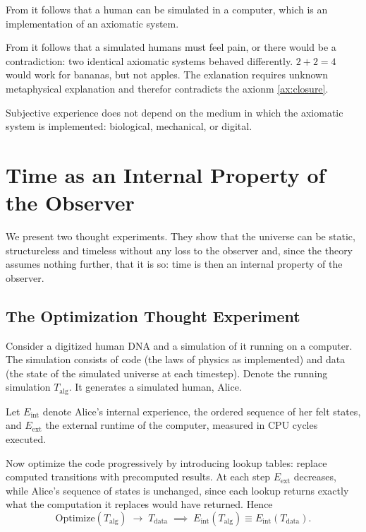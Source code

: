 \documentclass[11pt]{book}
\begin{document}
From  it follows that a human can be simulated in a
computer, which is an implementation of an axiomatic system.

From  it follows that a simulated humans must feel pain, or there
would be a contradiction: two identical axiomatic systems behaved differently.
$2+2=4$ would work for bananas, but not apples. The exlanation requires
unknown metaphysical explanation and therefor contradicts the axionm \ref{ax:closure}.

\begin{deduction}\label{ded:substrate}
  Subjective experience does not depend on the medium in which the
  axiomatic system is implemented: biological, mechanical, or digital.
\end{deduction}


\chapter{Time as an Internal Property of the Observer}
\label{ch:time}

We present two thought experiments. They show that the universe can be
static, structureless and timeless without any loss to the observer and,
since the theory assumes nothing further, that it is so: time is then an
internal property of the observer.


\section{The Optimization Thought Experiment}
\label{sec:optimization}

Consider a digitized human DNA and a simulation of it running on a computer.
The simulation consists of code (the laws of physics as implemented) and
data (the state of the simulated universe at each timestep). Denote the
running simulation $T_{\mathrm{alg}}$. It generates a simulated human, Alice.

Let $E_{\mathrm{int}}$ denote Alice's internal experience, the ordered
sequence of her felt states, and $E_{\mathrm{ext}}$ the external runtime
of the computer, measured in CPU cycles executed.

Now optimize the code progressively by introducing lookup tables: replace
computed transitions with precomputed results. At each step $E_{\mathrm{ext}}$
decreases, while Alice's sequence of states is unchanged, since each lookup
returns exactly what the computation it replaces would have returned. Hence
\[
  \mathrm{Optimize}(T_{\mathrm{alg}}) \;\rightarrow\; T_{\mathrm{data}}
  \;\implies\;
  E_{\mathrm{int}}(T_{\mathrm{alg}}) \equiv E_{\mathrm{int}}(T_{\mathrm{data}}).
\]
\end{document}
